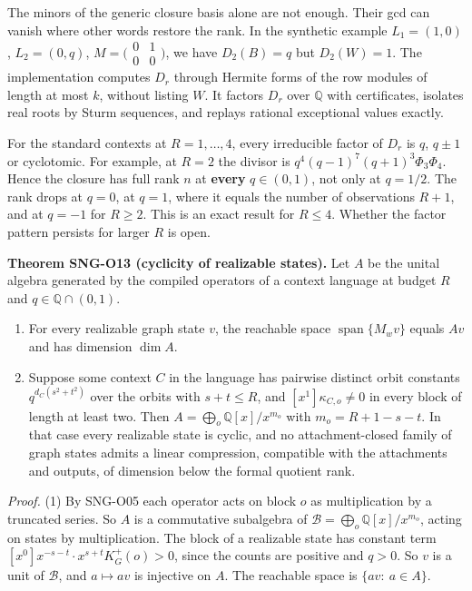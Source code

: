 \documentclass[
  11pt,
  a4paper,
]{report}
\providecommand{\tightlist}{%
  \setlength{\itemsep}{0pt}\setlength{\parskip}{0pt}}
\let\singularitytexttt\texttt
\renewcommand{\texttt}[1]{\singularitytexttt{\seqsplit{#1}}}
\begin{document}
The minors of the generic closure basis alone are not enough. Their gcd
can vanish where other words restore the rank. In the synthetic example
\(L_1=(1,0)\), \(L_2=(0,q)\),
\(M=\bigl(\begin{smallmatrix}0&1\\0&0\end{smallmatrix}\bigr)\), we have
\(D_2(B)=q\) but \(D_2(W)=1\). The implementation \texttt{parametric.py}
computes \(D_r\) through Hermite forms of the row modules of length at
most \(k\), without listing \(W\). It factors \(D_r\) over \(\mathbb Q\)
with certificates, isolates real roots by Sturm sequences, and replays
rational exceptional values exactly.

For the standard contexts at \(R=1,\ldots,4\), every irreducible factor
of \(D_r\) is \(q\), \(q\pm1\) or cyclotomic. For example, at \(R=2\)
the divisor is \(q^4(q-1)^7(q+1)^3\Phi_3\Phi_4\). Hence the closure has
full rank \(n\) at \textbf{every} \(q\in(0,1)\), not only at \(q=1/2\).
The rank drops at \(q=0\), at \(q=1\), where it equals the number of
observations \(R+1\), and at \(q=-1\) for \(R\ge2\). This is an exact
result for \(R\le4\). Whether the factor pattern persists for larger
\(R\) is open.

\textbf{Theorem SNG-O13 (cyclicity of realizable states).} Let \(A\) be
the unital algebra generated by the compiled operators of a context
language at budget \(R\) and \(q\in\mathbb Q\cap(0,1)\).

\begin{enumerate}
\def\labelenumi{\arabic{enumi}.}
\tightlist
\item
  For every realizable graph state \(v\), the reachable space
  \(\operatorname{span}\{M_wv\}\) equals \(Av\) and has dimension
  \(\dim A\).
\item
  Suppose some context \(C\) in the language has pairwise distinct orbit
  constants \(q^{d_C(s^2+t^2)}\) over the orbits with \(s+t\le R\), and
  \([x^1]\kappa_{C,o}\ne0\) in every block of length at least two. Then
  \(A=\bigoplus_o\mathbb Q[x]/x^{m_o}\) with \(m_o=R+1-s-t\). In that
  case every realizable state is cyclic, and no attachment-closed family
  of graph states admits a linear compression, compatible with the
  attachments and outputs, of dimension below the formal quotient rank.
\end{enumerate}

\emph{Proof.} (1) By SNG-O05 each operator acts on block \(o\) as
multiplication by a truncated series. So \(A\) is a commutative
subalgebra of \(\mathcal B=\bigoplus_o\mathbb Q[x]/x^{m_o}\), acting on
states by multiplication. The block of a realizable state has constant
term \([x^0]x^{-s-t}\cdot x^{s+t}K^+_G(o)>0\), since the counts are
positive and \(q>0\). So \(v\) is a unit of \(\mathcal B\), and
\(a\mapsto av\) is injective on \(A\). The reachable space is
\(\{av:\ a\in A\}\).
\end{document}

